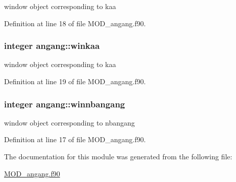 window object corresponding to kaa 



Definition at line 18 of file M\-O\-D\-\_\-angang.\-f90.

\hypertarget{classangang_a90e660f9f3271d0ea80c0ef0bd250e09}{
\subsubsection[{winkaa}]{\setlength{\rightskip}{0pt plus 5cm}integer angang\-::winkaa}}\label{classangang_a90e660f9f3271d0ea80c0ef0bd250e09}


window object corresponding to kaa 



Definition at line 19 of file M\-O\-D\-\_\-angang.\-f90.

\hypertarget{classangang_aecd4aef495e7c623de821a1e648ec3d1}{
\subsubsection[{winnbangang}]{\setlength{\rightskip}{0pt plus 5cm}integer angang\-::winnbangang}}\label{classangang_aecd4aef495e7c623de821a1e648ec3d1}


window object corresponding to nbangang 



Definition at line 17 of file M\-O\-D\-\_\-angang.\-f90.



The documentation for this module was generated from the following file\-:\begin{DoxyCompactItemize}
\item 
\hyperlink{MOD__angang_8f90}{M\-O\-D\-\_\-angang.\-f90}\end{DoxyCompactItemize}
